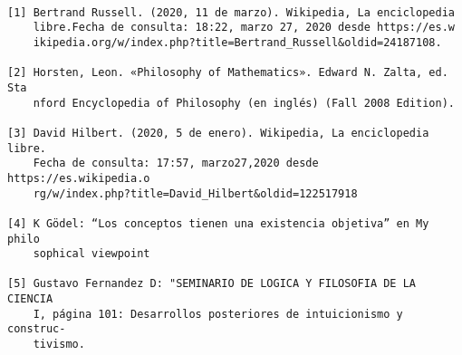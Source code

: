 \documentclass{article}
\begin{document}
\small 

\begin{verbatim}
 
[1] Bertrand Russell. (2020, 11 de marzo). Wikipedia, La enciclopedia 
    libre.Fecha de consulta: 18:22, marzo 27, 2020 desde https://es.w
    ikipedia.org/w/index.php?title=Bertrand_Russell&oldid=24187108.
    
[2] Horsten, Leon. «Philosophy of Mathematics». Edward N. Zalta, ed. Sta
    nford Encyclopedia of Philosophy (en inglés) (Fall 2008 Edition).
    
[3] David Hilbert. (2020, 5 de enero). Wikipedia, La enciclopedia libre.
    Fecha de consulta: 17:57, marzo27,2020 desde https://es.wikipedia.o
    rg/w/index.php?title=David_Hilbert&oldid=122517918
    
[4] K Gödel: “Los conceptos tienen una existencia objetiva” en My philo
    sophical viewpoint
    
[5] Gustavo Fernandez D: "SEMINARIO DE LOGICA Y FILOSOFIA DE LA CIENCIA 
    I, página 101: Desarrollos posteriores de intuicionismo y construc-    
    tivismo.
\end{verbatim}
\end{document}
